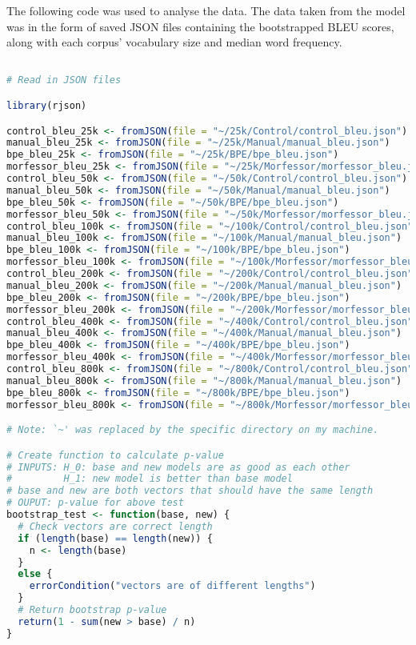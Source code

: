 \documentclass[11pt]{article}
\begin{document}
The following code was used to analyse the data. The data taken from the model was in the form of saved JSON files containing the bootstrapped BLEU scores, along with each corpus' vocabulary size and median word frequency.

\begin{lstlisting}[language=R]

# Read in JSON files

library(rjson)

control_bleu_25k <- fromJSON(file = "~/25k/Control/control_bleu.json")
manual_bleu_25k <- fromJSON(file = "~/25k/Manual/manual_bleu.json")
bpe_bleu_25k <- fromJSON(file = "~/25k/BPE/bpe_bleu.json")
morfessor_bleu_25k <- fromJSON(file = "~/25k/Morfessor/morfessor_bleu.json")
control_bleu_50k <- fromJSON(file = "~/50k/Control/control_bleu.json")
manual_bleu_50k <- fromJSON(file = "~/50k/Manual/manual_bleu.json")
bpe_bleu_50k <- fromJSON(file = "~/50k/BPE/bpe_bleu.json")
morfessor_bleu_50k <- fromJSON(file = "~/50k/Morfessor/morfessor_bleu.json")
control_bleu_100k <- fromJSON(file = "~/100k/Control/control_bleu.json")
manual_bleu_100k <- fromJSON(file = "~/100k/Manual/manual_bleu.json")
bpe_bleu_100k <- fromJSON(file = "~/100k/BPE/bpe_bleu.json")
morfessor_bleu_100k <- fromJSON(file = "~/100k/Morfessor/morfessor_bleu.json")
control_bleu_200k <- fromJSON(file = "~/200k/Control/control_bleu.json")
manual_bleu_200k <- fromJSON(file = "~/200k/Manual/manual_bleu.json")
bpe_bleu_200k <- fromJSON(file = "~/200k/BPE/bpe_bleu.json")
morfessor_bleu_200k <- fromJSON(file = "~/200k/Morfessor/morfessor_bleu.json")
control_bleu_400k <- fromJSON(file = "~/400k/Control/control_bleu.json")
manual_bleu_400k <- fromJSON(file = "~/400k/Manual/manual_bleu.json")
bpe_bleu_400k <- fromJSON(file = "~/400k/BPE/bpe_bleu.json")
morfessor_bleu_400k <- fromJSON(file = "~/400k/Morfessor/morfessor_bleu.json")
control_bleu_800k <- fromJSON(file = "~/800k/Control/control_bleu.json")
manual_bleu_800k <- fromJSON(file = "~/800k/Manual/manual_bleu.json")
bpe_bleu_800k <- fromJSON(file = "~/800k/BPE/bpe_bleu.json")
morfessor_bleu_800k <- fromJSON(file = "~/800k/Morfessor/morfessor_bleu.json")

# Note: `~' was replaced by the specific directory on my machine.

# Create function to calculate p-value
# INPUTS: H_0: base and new models are as good as each other
#         H_1: new model is better than base model
# base and new are both vectors that should have the same length
# OUPUT: p-value for above test
bootstrap_test <- function(base, new) {
  # Check vectors are correct length
  if (length(base) == length(new)) {
    n <- length(base)
  }
  else {
    errorCondition("vectors are of different lengths")
  }
  # Return bootstrap p-value
  return(1 - sum(new > base) / n)
}


\end{lstlisting}
\end{document}
